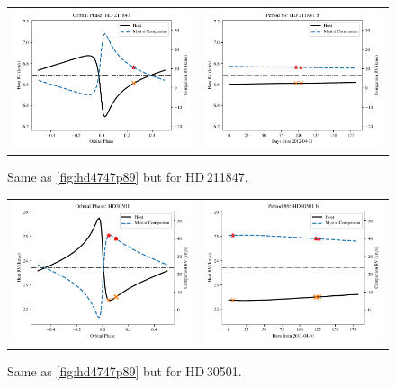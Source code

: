 \begin{figure}
    \centering
    \begin{tabular}{cc}
        \includegraphics[width=0.45\linewidth]{figures/direct-recovery/orbital-plots/HD211847_orbital_phase.pdf} &
        \includegraphics[width=0.45\linewidth]{figures/direct-recovery/orbital-plots/HD211847_p89.pdf}\\
    \end{tabular}
    \caption[]{Same as \cref{fig:hd4747p89} but for {HD\,211847}.}
    \label{fig:hd211847p89}
\end{figure}

\begin{figure}
    \centering
    \begin{tabular}{cc}
        \includegraphics[width=0.45\linewidth]{figures/direct-recovery/orbital-plots/HD30501_orbital_phase.pdf} &
        \includegraphics[width=0.45\linewidth]{figures/direct-recovery/orbital-plots/HD30501_p89.pdf}\\
    \end{tabular}
    \caption[]{Same as \cref{fig:hd4747p89} but for {HD\,30501}.}
    \label{fig:hd30501p89}
\end{figure}

